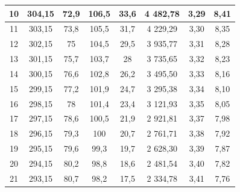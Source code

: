 \documentclass[a4paper,12pt]{article} %
\theoremstyle{plain} %
\theoremstyle{definition} %
\theoremstyle{remark} %
\begin{document}
\begin{table}[H]
\begin{center}
\begin{tabular}{|c|c|c|c|c|c|c|c|}
10         & 304,15        & 72,9                   & 106,5                  & 33,6                      & 4 482,78       & 3,29                                & 8,41         \\ \hline
11         & 303,15        & 73,8                   & 105,5                  & 31,7                      & 4 229,29       & 3,30                                & 8,35         \\ \hline
12         & 302,15        & 75                     & 104,5                  & 29,5                      & 3 935,77       & 3,31                                & 8,28         \\ \hline
13         & 301,15        & 75,7                   & 103,7                  & 28                        & 3 735,65       & 3,32                                & 8,23         \\ \hline
14         & 300,15        & 76,6                   & 102,8                  & 26,2                      & 3 495,50       & 3,33                                & 8,16         \\ \hline
15         & 299,15        & 77,2                   & 101,9                  & 24,7                      & 3 295,38       & 3,34                                & 8,10         \\ \hline
16         & 298,15        & 78                     & 101,4                  & 23,4                      & 3 121,93       & 3,35                                & 8,05         \\ \hline
17         & 297,15        & 78,6                   & 100,5                  & 21,9                      & 2 921,81       & 3,37                                & 7,98         \\ \hline
18         & 296,15        & 79,3                   & 100                    & 20,7                      & 2 761,71       & 3,38                                & 7,92         \\ \hline
19         & 295,15        & 79,6                   & 99,3                   & 19,7                      & 2 628,30       & 3,39                                & 7,87         \\ \hline
20         & 294,15        & 80,2                   & 98,8                   & 18,6                      & 2 481,54       & 3,40                                & 7,82         \\ \hline
21         & 293,15        & 80,7                   & 98,2                   & 17,5                      & 2 334,78       & 3,41                                & 7,76         \\ \hline
\end{tabular}
\end{center}
\end{table}
\end{document}
